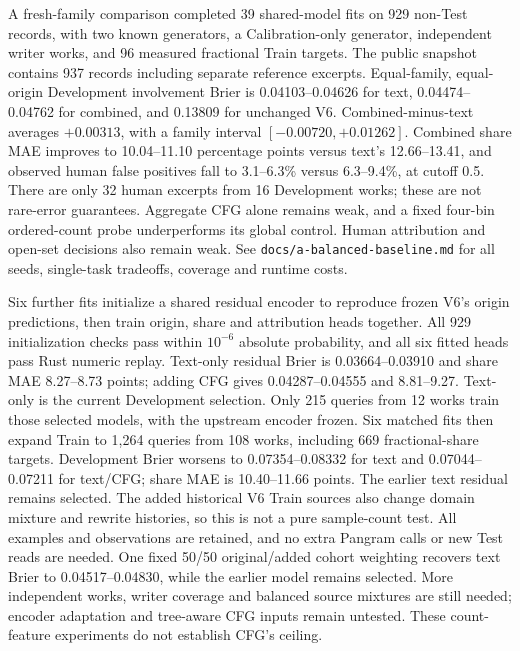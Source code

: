 A fresh-family comparison completed 39 shared-model fits on 929 non-Test records,
with two known generators, a Calibration-only generator, independent writer works,
and 96 measured fractional Train targets. The public snapshot contains 937 records
including separate reference excerpts. Equal-family, equal-origin Development
involvement Brier is 0.04103--0.04626 for text, 0.04474--0.04762 for combined,
and 0.13809 for unchanged V6. Combined-minus-text averages $+0.00313$, with a
family interval $[-0.00720,+0.01262]$. Combined share MAE improves to
10.04--11.10 percentage points versus text's 12.66--13.41, and observed human
false positives fall to 3.1--6.3\% versus 6.3--9.4\%, at cutoff 0.5. There are
only 32 human excerpts from 16 Development works; these are not rare-error
guarantees. Aggregate CFG alone remains weak, and a fixed four-bin ordered-count
probe underperforms its global control. Human attribution and open-set decisions
also remain weak. See \texttt{docs/a-balanced-baseline.md} for all seeds,
single-task tradeoffs, coverage and runtime costs.

Six further fits initialize a shared residual encoder to reproduce frozen V6's
origin predictions, then train origin, share and attribution heads together.
All 929 initialization checks pass within $10^{-6}$ absolute probability, and
all six fitted heads pass Rust numeric replay. Text-only residual Brier is
0.03664--0.03910 and share MAE 8.27--8.73 points; adding CFG gives
0.04287--0.04555 and 8.81--9.27. Text-only is the current Development selection.
Only 215 queries from 12 works train those selected models, with the upstream
encoder frozen. Six matched fits then expand Train to 1,264 queries from 108
works, including 669 fractional-share targets. Development Brier worsens to
0.07354--0.08332 for text and 0.07044--0.07211 for text/CFG; share MAE is
10.40--11.66 points. The earlier text residual remains selected. The added
historical V6 Train sources also change domain mixture and rewrite histories,
so this is not a pure sample-count test. All examples and observations are
retained, and no extra Pangram calls or new Test reads are needed. One fixed
50/50 original/added cohort weighting recovers text Brier to 0.04517--0.04830,
while the earlier model remains selected. More independent works, writer coverage
and balanced source mixtures are still needed; encoder adaptation and tree-aware
CFG inputs remain untested. These count-feature experiments do not establish
CFG's ceiling.

